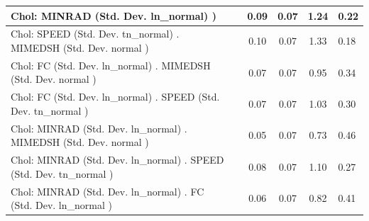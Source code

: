 \begin{table}
\begin{center}
\begin{tabular}{|l|l|c|c|c|l|}
			\hline
			 Chol: MINRAD (Std. Dev. ln_normal) ) &  & 0.09 & 0.07 & 1.24 & 0.22 \\
			\hline
			 Chol: SPEED (Std. Dev. tn_normal) . MIMEDSH (Std. Dev.   normal ) &  & 0.10 & 0.07 & 1.33 & 0.18 \\
			\hline
			 Chol: FC (Std. Dev. ln_normal) . MIMEDSH (Std. Dev.   normal ) &  & 0.07 & 0.07 & 0.95 & 0.34 \\
			\hline
			 Chol: FC (Std. Dev. ln_normal) . SPEED (Std. Dev.   tn_normal ) &  & 0.07 & 0.07 & 1.03 & 0.30 \\
			\hline
			 Chol: MINRAD (Std. Dev. ln_normal) . MIMEDSH (Std. Dev.   normal ) &  & 0.05 & 0.07 & 0.73 & 0.46 \\
			\hline
			 Chol: MINRAD (Std. Dev. ln_normal) . SPEED (Std. Dev.   tn_normal ) &  & 0.08 & 0.07 & 1.10 & 0.27 \\
			\hline
			 Chol: MINRAD (Std. Dev. ln_normal) . FC (Std. Dev.   ln_normal ) &  & 0.06 & 0.07 & 0.82 & 0.41 \\
			\hline
		\end{tabular}
	\end{center}
\end{table}